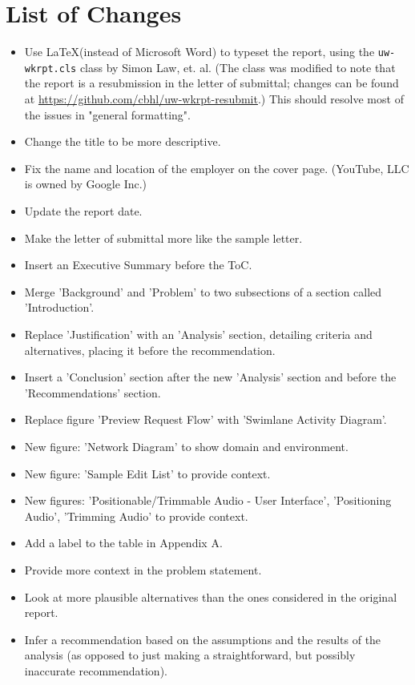\documentclass[se,resubmit]{uw-wkrpt}
\begin{document}
\mainmatter

\section{List of Changes}\label{sec:changes}

\begin{itemize}
  \item Use \LaTeX (instead of Microsoft Word) to typeset the report, using
	the \texttt{uw-wkrpt.cls} class by Simon Law, et. al. (The class
	was modified to note that the report is a resubmission in the
	letter of submittal; changes can be found at
	\url{https://github.com/cbhl/uw-wkrpt-resubmit}.) This should
	resolve most of the issues in "general formatting".
  \item Change the title to be more descriptive.
  \item Fix the name and location of the employer on the cover page.
        (YouTube, LLC is owned by Google Inc.)
  \item Update the report date.
  \item Make the letter of submittal more like the sample letter.
  \item Insert an Executive Summary before the ToC.
  \item Merge 'Background' and 'Problem' to two subsections of a section
        called 'Introduction'.
  \item Replace 'Justification' with an 'Analysis' section, detailing
        criteria and alternatives, placing it before the recommendation.
  \item Insert a 'Conclusion' section after the new 'Analysis' section and
        before the 'Recommendations' section.
  \item Replace figure 'Preview Request Flow' with 'Swimlane Activity
        Diagram'.
  \item New figure: 'Network Diagram' to show domain and environment.
  \item New figure: 'Sample Edit List' to provide context.
  \item New figures: 'Positionable/Trimmable Audio - User Interface',
        'Positioning Audio', 'Trimming Audio' to provide context.
  \item Add a label to the table in Appendix A.
  \item Provide more context in the problem statement.
  \item Look at more plausible alternatives than the ones considered in the
        original report.
  \item Infer a recommendation based on the assumptions and the results of
        the analysis (as opposed to just making a straightforward, but
	possibly inaccurate recommendation).
\end{itemize}
\end{document}
